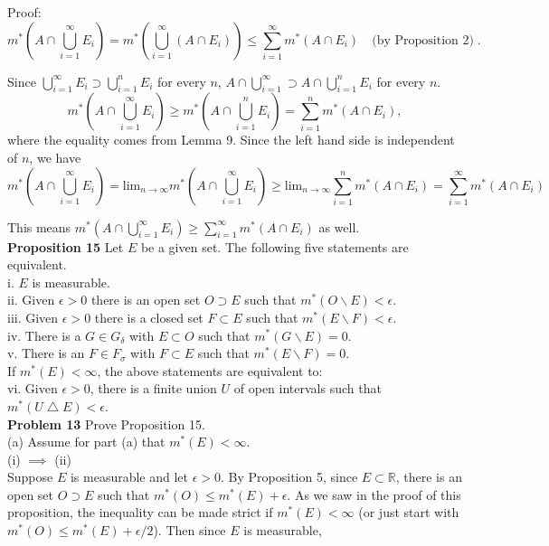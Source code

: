 \documentclass[a4paper]{article}
\begin{document}
Proof:
$$
m^*\left(A \cap \bigcup_{i=1}^\infty E_i \right) = m^*\left(\bigcup_{i=1}^\infty (A \cap E_i) \right)
\leq \sum_{i = 1}^\infty m^*(A \cap E_i) \quad \text{(by Proposition 2)}\; .
$$

Since $\bigcup_{i=1}^\infty E_i\supset \bigcup_{i=1}^n E_i$ for every $n$, $A\cap \bigcup_{i=1}^\infty \supset A \cap \bigcup_{i=1}^n E_i$ for every $n$.
$$
      m^*\left(A\cap \bigcup_{i=1}^\infty E_i\right)
      \ge m^*\left(A\cap \bigcup_{i=1}^n E_i\right)
      = \sum_{i=1}^n m^*(A\cap E_i),
$$
    where the equality comes from Lemma 9. Since the left hand side is 
    independent of $n$, we have
    $$
      m^*\left(A\cap \bigcup_{i=1}^\infty E_i\right) = \text{lim}_{n\rightarrow \infty} m^*\left(A\cap \bigcup_{i=1}^\infty E_i\right)  \geq \text{lim}_{n\rightarrow \infty}
      \sum_{i=1}^n m^*(A\cap E_i) = \sum_{i=1}^\infty m^*(A\cap E_i)
    $$
    
    This means $m^*\left(A\cap \bigcup_{i=1}^\infty E_i\right) \geq \sum_{i=1}^\infty m^*(A\cap E_i)$ as well.\\
    
{\bf Proposition 15} Let $E$ be a given set. The following five statements are equivalent.\\

i. $E$ is measurable.\\
ii. Given $\epsilon > 0$ there is an open set $O \supset E$ such that $m^*(O \backslash E) < \epsilon$. \\
iii. Given $\epsilon > 0$ there is a closed set $F \subset E$ such that $m^*(E \backslash F) < \epsilon$.\\
iv. There is a $G \in G_{\delta}$ with $E \subset O$ such that $m^*(G \backslash E) = 0$.\\
v. There is an $F \in F_\sigma$ with $F \subset E$ such that $m^*(E \backslash F) = 0$. \\

If $m^*(E) < \infty$, the above statements are equivalent to:\\

vi. Given $\epsilon > 0$, there is a finite union $U$ of open intervals such that $m^*(U \bigtriangleup E) < \epsilon$.\\

{\bf Problem 13} Prove Proposition 15.\\

(a) Assume for part (a) that $m^*(E) < \infty$.\\

(i) $\implies$ (ii)\\
Suppose $E$ is measurable and let $\epsilon > 0$. By Proposition 5, since $E \subset \mathbb{R}$, there is an open set $O \supset E$ such that $m^*(O) \leq m^*(E) + \epsilon$. As we saw in the proof of this proposition, the inequality can be made strict if $m^*(E) < \infty$ (or just start with $m^*(O) \leq m^*(E) + \epsilon / 2$). Then since $E$ is measurable,
\end{document}
